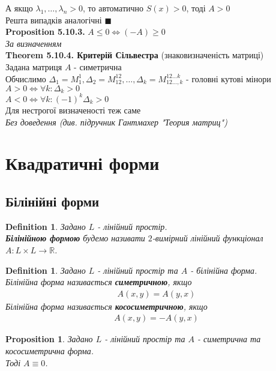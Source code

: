 \documentclass[a4paper, 10pt]{article}
\def\prp#1{\textbf{Proposition {#1}}}
\def\th#1{\textbf{Theorem {#1}}}
\def\qed{$\blacksquare$}
\theoremstyle{theoremdd}
\theoremstyle{theoremdd}
\newtheorem{definition}[theorem]{Definition}
\theoremstyle{theoremdd}
\theoremstyle{theoremdd}
\theoremstyle{theoremdd}
\newtheorem{proposition}[theorem]{Proposition}
\theoremstyle{theoremdd}
\theoremstyle{theoremdd}
\theoremstyle{theoremdd}
\begin{document}
А якщо $\lambda_1,\dots,\lambda_n > 0$, то автоматично $S(x) > 0$, тоді $A>0$\\
Решта випадків аналогічні \qed
\bigskip \\
\prp{5.10.3.} $A \leq 0 \iff (-A) \geq 0$\\
\textit{За визначенням}
\bigskip \\
\th{5.10.4. Критерій Сільвестра} (знаковизначеність матриці)\\
Задана матриця $A$ - симетрична\\
Обчислимо $\Delta_1 = M_1^1, \Delta_2 = M_{12}^{12}, \dots, \Delta_k = M^{12\dots k}_{12 \dots, k}$ - головні кутові мінори\\
$A>0 \iff \forall k: \Delta_k > 0$\\
$A < 0 \iff \forall k: (-1)^k \Delta_k > 0$\\
Для нестрогої визначеності теж саме\\
\textit{Без доведення (див. підручник Гантмахер "Теория матриц")}
\bigskip \\
\fi

\newpage


\section{Квадратичні форми}
\subsection{Білінійні форми}
\begin{definition}
Задано $L$ - лінійний простір.\\
\textbf{Білінійною формою} будемо називати $2$-вимірний лінійний функціонал $A: L \times L \to \mathbb{R}$.
\end{definition}

\begin{definition}
Задано $L$ - лінійний простір та $A$ - білінійна форма.\\
Білінійна форма називається \textbf{симетричною}, якщо
\begin{align*}
A(x,y) = A(y,x)
\end{align*}
Білінійна форма називається \textbf{кососиметричною}, якщо
\begin{align*}
A(x,y) = -A(y,x)
\end{align*}
\end{definition}

\begin{proposition}
Задано $L$ - лінійний простір та $A$ - симетрична та кососиметрична форма.\\
Тоді $A \equiv 0$.
\end{proposition}
\end{document}
